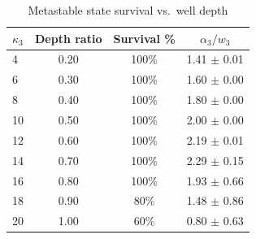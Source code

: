 \begin{table}[h]
\centering
\caption{Metastable state survival vs.\ well depth}
\label{tab:e13_survival}
\begin{tabular}{lccc}
\toprule
$\kappa_3$ & Depth ratio & Survival \% & $\alpha_3/w_3$ \\
\midrule
4 & 0.20 & 100\% & 1.41 $\pm$ 0.01 \\
6 & 0.30 & 100\% & 1.60 $\pm$ 0.00 \\
8 & 0.40 & 100\% & 1.80 $\pm$ 0.00 \\
10 & 0.50 & 100\% & 2.00 $\pm$ 0.00 \\
12 & 0.60 & 100\% & 2.19 $\pm$ 0.01 \\
14 & 0.70 & 100\% & 2.29 $\pm$ 0.15 \\
16 & 0.80 & 100\% & 1.93 $\pm$ 0.66 \\
18 & 0.90 & 80\% & 1.48 $\pm$ 0.86 \\
20 & 1.00 & 60\% & 0.80 $\pm$ 0.63 \\
\bottomrule
\end{tabular}
\end{table}
